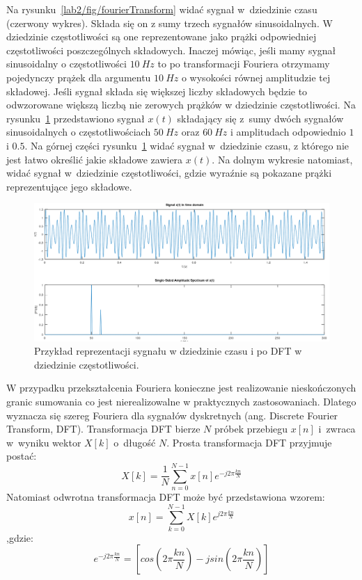 Na rysunku~\ref{lab2/fig/fourierTransform} widać sygnał w~dziedzinie czasu (czerwony wykres). Składa się on z sumy trzech sygnałów sinusoidalnych. W dziedzinie częstotliwości są one reprezentowane jako prążki odpowiedniej częstotliwości poszczególnych składowych. Inaczej mówiąc, jeśli mamy sygnał sinusoidalny o częstotliwości $10~Hz$ to po transformacji Fouriera otrzymamy pojedynczy prążek dla argumentu $10~Hz$ o wysokości równej amplitudzie tej składowej. Jeśli sygnał składa się większej liczby składowych będzie to odwzorowane większą liczbą nie zerowych prążków w dziedzinie częstotliwości. Na rysunku~\ref{lab2/fig/signalInTimeAndFrequencyDomain} przedstawiono sygnał $x(t)$ składający się z~sumy dwóch sygnałów sinusoidalnych o częstotliwościach $50~Hz$ oraz $60~Hz$ i amplitudach odpowiednio $1$ i $0.5$. Na górnej części rysunku~\ref{lab2/fig/signalInTimeAndFrequencyDomain} widać sygnał w~dziedzinie czasu, z którego nie jest łatwo określić jakie składowe zawiera $x(t)$. Na dolnym wykresie natomiast, widać sygnał w~dziedzinie częstotliwości, gdzie wyraźnie są pokazane prążki reprezentujące jego składowe.

\begin{figure}[hbt!]
	\centering
	\includegraphics[width=0.9\linewidth]{images/signalInTimeAndFrequencyDomain.png}
	\caption{Przykład reprezentacji sygnału w dziedzinie czasu i po DFT w dziedzinie częstotliwości.}
	\label{lab2/fig/signalInTimeAndFrequencyDomain}
\end{figure}

W przypadku przekształcenia Fouriera konieczne jest realizowanie nieskończonych granic sumowania co jest nierealizowalne w praktycznych zastosowaniach. Dlatego wyznacza się szereg Fouriera dla sygnałów dyskretnych (ang. Discrete Fourier Transform, DFT). Transformacja DFT bierze $N$ próbek przebiegu $x[n]$ i~zwraca w~wyniku wektor $X[k]$ o~długość $N$. Prosta transformacja DFT przyjmuje postać:
\begin{equation}
	X[k] = \frac{1}{N} \sum_{n=0}^{N-1} x[n] e^{-j2\pi \frac{kn}{N}}
\end{equation}
Natomiast odwrotna transformacja DFT może być przedstawiona wzorem:
\begin{equation}
	x[n] = \sum_{k=0}^{N-1} X[k] e^{j2\pi \frac{kn}{N}}
\end{equation}
,gdzie:
\begin{equation}
	e^{-j2\pi \frac{kn}{N}} = [cos(2\pi \frac{kn}{N}) - jsin(2\pi \frac{kn}{N})]
\end{equation}

